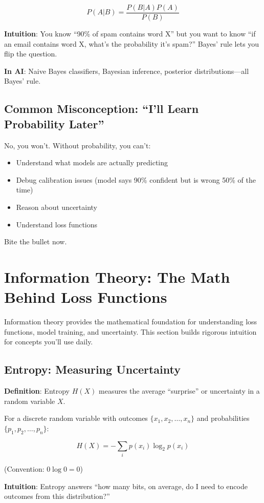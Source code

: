 \documentclass[11pt,oneside]{book}
\begin{document}
\[
P(A|B) = \frac{P(B|A) P(A)}{P(B)}
\]

\textbf{Intuition}: You know ``90\% of spam contains word X'' but you want to know ``if an email contains word X, what's the probability it's spam?'' Bayes' rule lets you flip the question.

\textbf{In AI}: Naive Bayes classifiers, Bayesian inference, posterior distributions---all Bayes' rule.

\subsection{Common Misconception: ``I'll Learn Probability Later''}

No, you won't. Without probability, you can't:
\begin{itemize}
\item Understand what models are actually predicting
\item Debug calibration issues (model says 90\% confident but is wrong 50\% of the time)
\item Reason about uncertainty
\item Understand loss functions
\end{itemize}

Bite the bullet now.

\section{Information Theory: The Math Behind Loss Functions}

Information theory provides the mathematical foundation for understanding loss functions, model training, and uncertainty. This section builds rigorous intuition for concepts you'll use daily.

\subsection{Entropy: Measuring Uncertainty}

\textbf{Definition}: Entropy $H(X)$ measures the average ``surprise'' or uncertainty in a random variable $X$.

For a discrete random variable with outcomes $\{x_1, x_2, \ldots, x_n\}$ and probabilities $\{p_1, p_2, \ldots, p_n\}$:

\[
H(X) = -\sum_{i} p(x_i) \log_2 p(x_i)
\]

(Convention: $0 \log 0 = 0$)

\textbf{Intuition}: Entropy answers ``how many bits, on average, do I need to encode outcomes from this distribution?''
\end{document}
